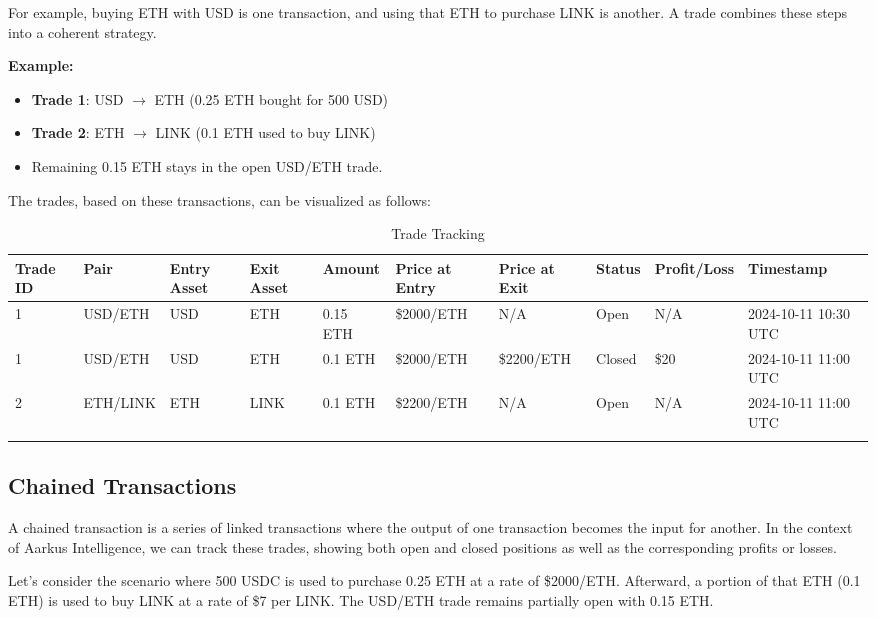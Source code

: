 \documentclass{article}
\begin{document}
For example, buying ETH with USD is one transaction, and using that ETH to purchase LINK is another. A trade combines these steps into a coherent strategy.

\textbf{Example:}
\begin{itemize}
    \item \textbf{Trade 1}: USD $\rightarrow$ ETH (0.25 ETH bought for 500 USD)
    \item \textbf{Trade 2}: ETH $\rightarrow$ LINK (0.1 ETH used to buy LINK)
    \item Remaining 0.15 ETH stays in the open USD/ETH trade.
\end{itemize}

The trades, based on these transactions, can be visualized as follows:

\scriptsize %
\begin{longtable}{|p{1cm}|p{1.2cm}|p{1.2cm}|p{1.2cm}|p{1.2cm}|p{1.5cm}|p{1.5cm}|p{1.2cm}|p{1.2cm}|p{1.5cm}|}
\hline
\textbf{Trade ID} & \textbf{Pair} & \textbf{Entry Asset} & \textbf{Exit Asset} & \textbf{Amount} & \textbf{Price at Entry} & \textbf{Price at Exit} & \textbf{Status} & \textbf{Profit/Loss} & \textbf{Timestamp} \\
\hline
1 & USD/ETH & USD & ETH & 0.15 ETH & \$2000/ETH & N/A & Open & N/A & 2024-10-11 10:30 UTC \\
\hline
1 & USD/ETH & USD & ETH & 0.1 ETH & \$2000/ETH & \$2200/ETH & Closed & \$20 & 2024-10-11 11:00 UTC \\
\hline
2 & ETH/LINK & ETH & LINK & 0.1 ETH & \$2200/ETH & N/A & Open & N/A & 2024-10-11 11:00 UTC \\
\hline
\caption{Trade Tracking}
\end{longtable}
\normalsize %
\subsection{Chained Transactions}

A chained transaction is a series of linked transactions where the output of one transaction becomes the input for another. In the context of Aarkus Intelligence, we can track these trades, showing both open and closed positions as well as the corresponding profits or losses.

Let’s consider the scenario where 500 USDC is used to purchase 0.25 ETH at a rate of \$2000/ETH. Afterward, a portion of that ETH (0.1 ETH) is used to buy LINK at a rate of \$7 per LINK. The USD/ETH trade remains partially open with 0.15 ETH.
\end{document}
